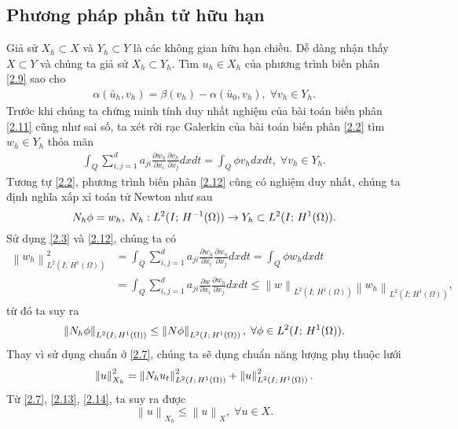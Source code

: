 \documentclass[]{article}
\begin{document}
\subsection{Phương pháp phần tử hữu hạn}
\qquad Giả sử $X_h\subset X$ và $Y_h\subset Y$ là các không gian hữu hạn chiều. Dễ dàng nhận thấy $X\subset Y$ và chúng ta giả sử $X_h\subset Y_h$. Tìm $u_h\in X_h$ của phương trình biến phân \eqref{2.9} sao cho
\begin{align}\label{2.11}
	\alpha(\bar{u}_h, v_h)=\beta(v_h)-\alpha(\bar{u}_0, v_h),\; \forall v_h \in Y_h.
\end{align}
Trước khi chúng ta chứng minh tính duy nhất nghiệm của bài toán biến phân \eqref{2.11} cũng như sai số, ta xét rời rạc Galerkin của bài toán biến phân \eqref{2.2} tìm $w_h\in Y_h$ thỏa mãn
\begin{align}\label{2.12}
	\int_{Q}\sum_{i, j=1}^{d}a_{ji}\frac{\partial w_h}{\partial x_i}\frac{\partial v_h}{\partial x_j}dxdt=\int_{Q}\phi v_hdxdt,\; \forall v_h\in Y_h.
\end{align}
Tương tự \eqref{2.2}, phương trình biến phân \eqref{2.12} cũng có nghiệm duy nhất, chúng ta định nghĩa xấp xỉ toán tử Newton như sau
$$\mathnormal{N}_h\phi=w_h,\;\mathnormal{N}_h: L^2(I;\, H^{-1}(\Omega))\to Y_h\subset L^2(I;\, H^1(\Omega)).$$
Sử dụng \eqref{2.3} và \eqref{2.12}, chúng ta có
\begin{align*}
	\left\|w_h\right\|_{L^2(I;\, H^1(\Omega))}^2&=\int_{Q}\sum_{i, j=1}^{d}a_{ji}\frac{\partial w_h}{\partial x_i}\frac{\partial w_h}{\partial x_j}dxdt=\int_Q\phi w_hdxdt\\
	&=\int_Q\sum_{i, j=1}^{d}a_{ji}\frac{\partial w}{\partial x_i}\frac{\partial w_h}{\partial x_j}dxdt\leq \left\|w\right\|_{L^2(I;\, H^1(\Omega))}\left\|w_h\right\|_{L^2(I;\, H^1(\Omega))}, 
\end{align*}
từ đó ta suy ra
\begin{align}\label{2.13}
	\left\|\mathnormal{N}_h\phi\right\|_{L^2(I;\, H^1(\Omega))}\leq \left\|\mathnormal{N}\phi\right\|_{L^2(I;\, H^1(\Omega))},\; \forall \phi\in L^2(I;\, H^1(\Omega)).
\end{align}
Thay vì sử dụng chuẩn ở \eqref{2.7}, chúng ta sẽ dụng chuẩn năng lượng phụ thuộc lưới
\begin{align}\label{2.14}
	\left\|u\right\|_{X_h}^2= \left\|\mathnormal{N}_hu_t\right\|_{L^2(I;\, H^1(\Omega))}^2+\left\|u\right\|_{L^2(I;\, H^1(\Omega))}^2.
\end{align}
Từ \eqref{2.7}, \eqref{2.13}, \eqref{2.14}, ta suy ra được
$$\left\|u\right\|_{X_h}\leq \left\|u\right\|_{X}, \; \forall u\in X.$$
\end{document}
